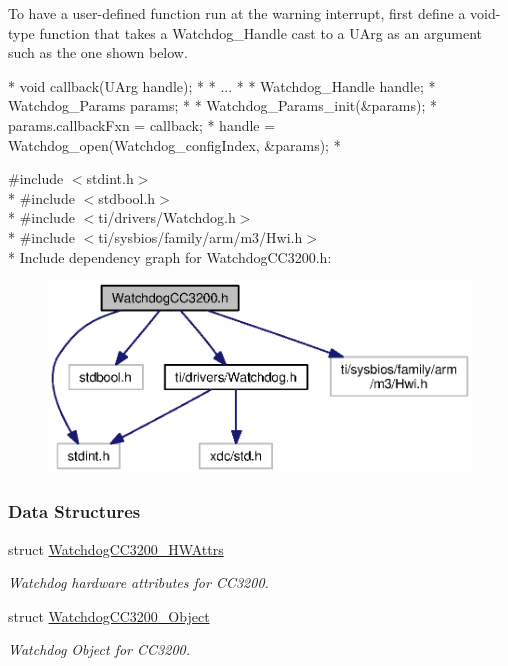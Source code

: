 To have a user-\/defined function run at the warning interrupt, first define a void-\/type function that takes a Watchdog\-\_\-\-Handle cast to a U\-Arg as an argument such as the one shown below.


\begin{DoxyCode}
*  \textcolor{keywordtype}{void} callback(UArg handle);
*
*  ...
*
*  Watchdog_Handle handle;
*  Watchdog_Params params;
*
*  Watchdog_Params_init(&params);
*  params.callbackFxn = callback;
*  handle = Watchdog_open(Watchdog\_configIndex, &params);
*  
\end{DoxyCode}


{\ttfamily \#include $<$stdint.\-h$>$}\\*
{\ttfamily \#include $<$stdbool.\-h$>$}\\*
{\ttfamily \#include $<$ti/drivers/\-Watchdog.\-h$>$}\\*
{\ttfamily \#include $<$ti/sysbios/family/arm/m3/\-Hwi.\-h$>$}\\*
Include dependency graph for Watchdog\-C\-C3200.\-h\-:
\nopagebreak
\begin{figure}[H]
\begin{center}
\leavevmode
\includegraphics[width=350pt]{_watchdog_c_c3200_8h__incl}
\end{center}
\end{figure}
\subsubsection*{Data Structures}
\begin{DoxyCompactItemize}
\item 
struct \hyperlink{struct_watchdog_c_c3200___h_w_attrs}{Watchdog\-C\-C3200\-\_\-\-H\-W\-Attrs}
\begin{DoxyCompactList}\small\item\em Watchdog hardware attributes for C\-C3200. \end{DoxyCompactList}\item 
struct \hyperlink{struct_watchdog_c_c3200___object}{Watchdog\-C\-C3200\-\_\-\-Object}
\begin{DoxyCompactList}\small\item\em Watchdog Object for C\-C3200. \end{DoxyCompactList}\end{DoxyCompactItemize}
